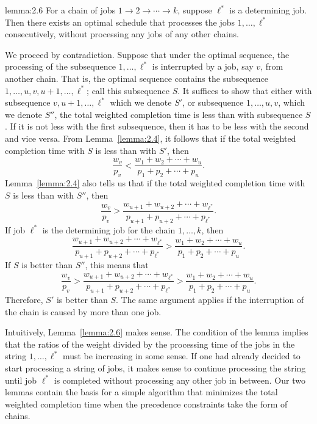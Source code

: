 \begin{lemma}{lemma:2.6}
    For a chain of jobs $1 \to 2 \to \cdots \to k$, suppose $\ell^*$ is 
    a determining job. Then there exists an optimal schedule that processes 
    the jobs $1, \dots, \ell^*$ consecutively, without processing any jobs 
    of any other chains. 
\end{lemma}
\begin{pf}
    We proceed by contradiction. Suppose that under the optimal sequence, 
    the processing of the subsequence $1, \dots, \ell^*$ is interrupted by a 
    job, say $v$, from another chain. That is, the optimal sequence 
    contains the subsequence $1, \dots, u, v, u+1, \dots, \ell^*$; call 
    this subsequence $S$. It suffices to show that either with subsequence 
    $v, u+1, \dots, \ell^*$ which we denote $S'$, or subsequence 
    $1, \dots, u, v$, which we denote $S''$, the total weighted completion 
    time is less than with subsequence $S$. If it is not less with the
    first subsequence, then it has to be less with the second and vice versa.
    From Lemma~\ref{lemma:2.4}, it follows that if the total weighted 
    completion time with $S$ is less than with $S'$, then
    \[ \frac{w_v}{p_v} < \frac{w_1 + w_2 + \cdots + w_u}{p_1 + p_2 + \cdots 
    + p_u}. \] 
    Lemma~\ref{lemma:2.4} also tells us that if the total weighted completion 
    time with $S$ is less than with $S''$, then
    \[ \frac{w_v}{p_v} > \frac{w_{u+1} + w_{u+2} + \cdots + w_{\ell^*}}
    {p_{u+1} + p_{u+2} + \cdots + p_{\ell^*}}. \] 
    If job $\ell^*$ is the determining job for the chain $1, \dots, k$, then 
    \[ \frac{w_{u+1} + w_{u+2} + \cdots + w_{\ell^*}}
    {p_{u+1} + p_{u+2} + \cdots + p_{\ell^*}} > \frac{w_1 + w_2 + \cdots + w_u}
    {p_1 + p_2 + \cdots + p_u}. \] 
    If $S$ is better than $S''$, this means that 
    \[ \frac{w_v}{p_v} > \frac{w_{u+1} + w_{u+2} + \cdots + w_{\ell^*}}
    {p_{u+1} + p_{u+2} + \cdots + p_{\ell^*}} > \frac{w_1 + w_2 + \cdots + w_u}
    {p_1 + p_2 + \cdots + p_u}. \] 
    Therefore, $S'$ is better than $S$. The same argument applies if the 
    interruption of the chain is caused by more than one job. 
\end{pf}

Intuitively, Lemma~\ref{lemma:2.6} makes sense. The condition of the lemma 
implies that the ratios of the weight divided by the processing time of the 
jobs in the string $1, \dots, \ell^*$ must be increasing in some sense. 
If one had already decided to start processing a string of jobs, it makes 
sense to continue processing the string until job $\ell^*$ is completed 
without processing any other job in between. Our two lemmas contain the 
basis for a simple algorithm that minimizes the total weighted completion 
time when the precedence constraints take the form of chains.

